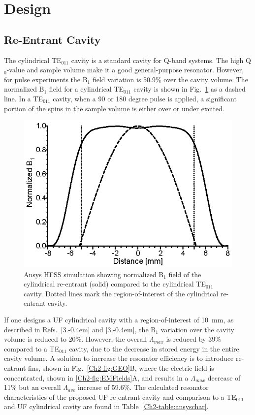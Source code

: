 \section{Design}
\subsection{Re-Entrant \cylTE{} Cavity}

The cylindrical TE$_{011}$ cavity is a standard cavity for Q-band systems. The high Q$_0$-value and sample volume make it a good general-purpose resonator. However, for pulse experiments the B$_1$ field variation is 50.9\% over the cavity volume. The normalized B$_1$ field for a cylindrical TE$_{011}$ cavity is shown in Fig.~\ref{Ch2-fig:normb1} as a dashed line. In a TE$_{011}$ cavity, when a 90 or 180 degree pulse is applied, a significant portion of the spins in the sample volume is either over or under excited. 

\begin{figure}[htp]\centering
 \includegraphics{Kapitel/Ch2-Images/02-TE01UProfile.eps}
 \caption[Ansys HFSS simulation of normalized B$_1$ field.]{Ansys HFSS simulation showing normalized B$_1$ field of the cylindrical re-entrant \cylTE{} (solid) compared to the cylindrical TE$_{\text{011}}$ cavity. Dotted lines mark the region-of-interest of the cylindrical re-entrant \cylTE{} cavity. }
 \label{Ch2-fig:normb1}
\end{figure}

If one designs a UF cylindrical \cylTE{} cavity with a region-of-interest of 10~mm, as described in Refs.~[3.\kern-0.4em] and [3.\kern-0.4em], the B$_1$ variation over the cavity volume is reduced to 20\%. However, the overall $\Lambda_{max}$ is reduced by 39\% compared to a TE$_{011}$ cavity, due to the decrease in stored energy in the entire cavity volume. A solution to increase the resonator efficiency is to introduce re-entrant fins, shown in Fig.~\ref{Ch2-fig:GEO}B, where the electric field is concentrated, shown in \ref{Ch2-fig:EMFields}A, and results in a $\Lambda_{max}$ decrease of 11\% but an overall $\Lambda_{ave}$ increase of 59.6\%. The calculated resonator characteristics of the proposed UF re-entrant \cylTE{} cavity and comparison to a TE$_{011}$ and UF cylindrical \cylTE{} cavity are found in Table~\ref{Ch2-table:ansyschar}.

